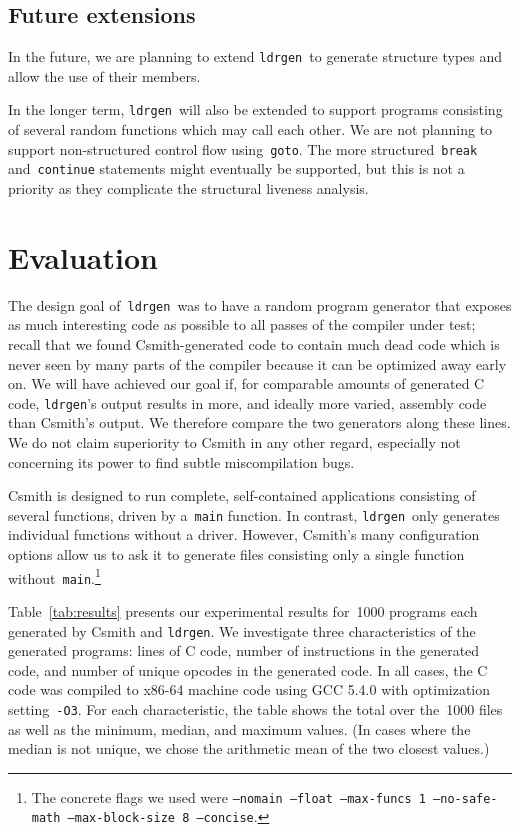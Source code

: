 \documentclass[a4paper]{easychair}
\newcommand\ldrgen{\texttt{ldrgen}}
\begin{document}
\subsection{Future extensions}

In the future, we are planning to extend \ldrgen\ to generate structure
types and allow the use of their members.

In the longer term, \ldrgen\ will also be extended to support programs
consisting of several random functions which may call each other. We are not
planning to support non-structured control flow using~\verb|goto|. The more
structured~\verb|break| and~\verb|continue| statements might eventually be
supported, but this is not a priority as they complicate the structural
liveness analysis.


\section{Evaluation}
\label{sec:evaluation}

The design goal of~\ldrgen\ was to have a random program generator that
exposes as much interesting code as possible to all passes of the compiler
under test; recall that we found Csmith-generated code to contain much dead
code which is never seen by many parts of the compiler because it can be
optimized away early on. We will have achieved our goal if, for comparable
amounts of generated C code, \ldrgen's output results in more, and ideally
more varied, assembly code than Csmith's output. We therefore compare the
two generators along these lines. We do not claim superiority to Csmith in
any other regard, especially not concerning its power to find subtle
miscompilation bugs.

Csmith is designed to run complete, self-contained applications consisting
of several functions, driven by a~\verb|main| function. In contrast,
\ldrgen\ only generates individual functions without a driver. However,
Csmith's many configuration options allow us to ask it to generate files
consisting only a single function without~\verb|main|.\footnote{The concrete
flags we used were \texttt{--nomain --float --max-funcs 1 --no-safe-math
--max-block-size 8 --concise}.}

Table~\ref{tab:results} presents our experimental results for~1000 programs
each generated by Csmith and \ldrgen. We investigate three characteristics
of the generated programs: lines of C code, number of instructions in the
generated code, and number of unique opcodes in the generated code. In all
cases, the C code was compiled to x86-64 machine code using GCC 5.4.0 with
optimization setting~\verb|-O3|. For each characteristic, the table shows
the total over the~1000 files as well as the minimum, median, and maximum
values. (In cases where the median is not unique, we chose the arithmetic
mean of the two closest values.)
\end{document}
